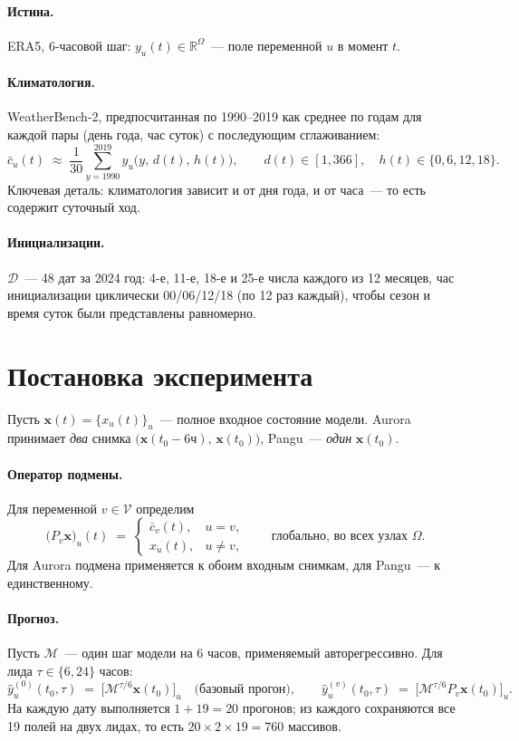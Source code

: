 \documentclass[11pt]{article}
\begin{document}
\paragraph{Истина.} ERA5, 6-часовой шаг: $y_u(t) \in \mathbb{R}^{\Omega}$~--- поле переменной
$u$ в момент $t$.

\paragraph{Климатология.} WeatherBench-2, предпосчитанная по 1990--2019 как среднее по годам
для каждой пары (день года, час суток) с последующим сглаживанием:
\[
\bar c_u(t) \;\approx\; \frac{1}{30}\sum_{y=1990}^{2019} y_u\big(y,\, d(t),\, h(t)\big),
\qquad d(t)\in[1,366],\quad h(t)\in\{0,6,12,18\}.
\]
Ключевая деталь: климатология зависит и от дня года, и от часа~--- то есть содержит суточный ход.

\paragraph{Инициализации.} $\mathcal{D}$~--- 48 дат за 2024 год: 4-е, 11-е, 18-е и 25-е числа
каждого из 12 месяцев, час инициализации циклически 00/06/12/18 (по 12 раз каждый), чтобы
сезон и время суток были представлены равномерно.

\section{Постановка эксперимента}

Пусть $\mathbf{x}(t) = \{x_u(t)\}_{u}$~--- полное входное состояние модели. Aurora принимает
\emph{два} снимка $\big(\mathbf{x}(t_0-6\text{ч}),\,\mathbf{x}(t_0)\big)$, Pangu~--- \emph{один}
$\mathbf{x}(t_0)$.

\paragraph{Оператор подмены.} Для переменной $v \in \mathcal{V}$ определим
\[
\big(P_v\mathbf{x}\big)_u(t) \;=\;
\begin{cases}
\bar c_v(t), & u = v,\\[2pt]
x_u(t), & u \neq v,
\end{cases}
\qquad \text{глобально, во всех узлах } \Omega .
\]
Для Aurora подмена применяется к обоим входным снимкам, для Pangu~--- к единственному.

\paragraph{Прогноз.} Пусть $\mathcal{M}$~--- один шаг модели на 6 часов, применяемый
авторегрессивно. Для лида $\tau \in \{6, 24\}$ часов:
\[
\hat y^{(0)}_u(t_0,\tau) \;=\; \big[\mathcal{M}^{\tau/6}\mathbf{x}(t_0)\big]_u
\quad\text{(базовый прогон)},
\qquad
\hat y^{(v)}_u(t_0,\tau) \;=\; \big[\mathcal{M}^{\tau/6}P_v\mathbf{x}(t_0)\big]_u .
\]
На каждую дату выполняется $1 + 19 = 20$ прогонов; из каждого сохраняются все 19 полей на
двух лидах, то есть $20 \times 2 \times 19 = 760$ массивов.
\end{document}
